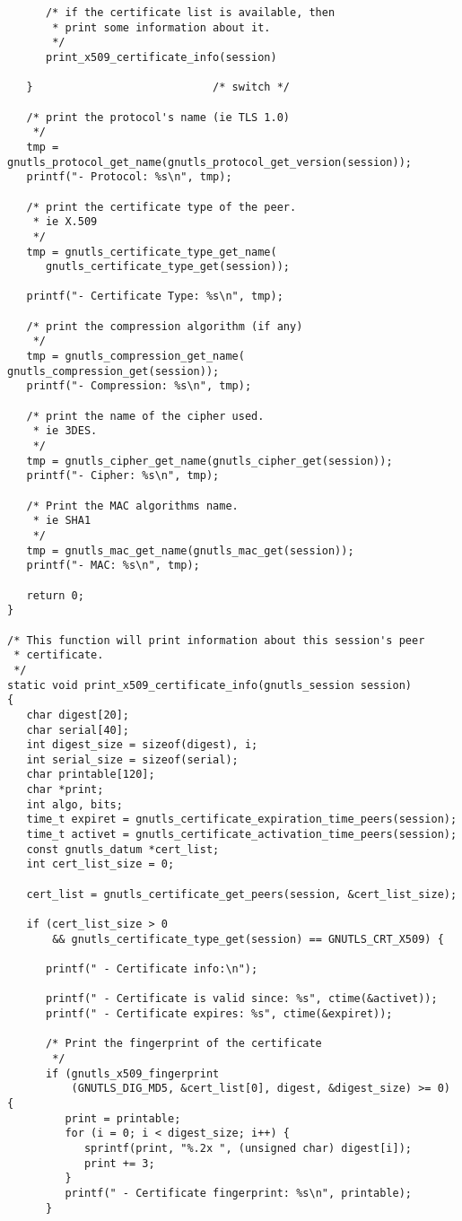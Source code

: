 \begin{verbatim}
      /* if the certificate list is available, then
       * print some information about it.
       */
      print_x509_certificate_info(session)

   }                            /* switch */

   /* print the protocol's name (ie TLS 1.0) 
    */
   tmp = gnutls_protocol_get_name(gnutls_protocol_get_version(session));
   printf("- Protocol: %s\n", tmp);

   /* print the certificate type of the peer.
    * ie X.509
    */
   tmp = gnutls_certificate_type_get_name(
      gnutls_certificate_type_get(session));

   printf("- Certificate Type: %s\n", tmp);

   /* print the compression algorithm (if any)
    */
   tmp = gnutls_compression_get_name( gnutls_compression_get(session));
   printf("- Compression: %s\n", tmp);

   /* print the name of the cipher used.
    * ie 3DES.
    */
   tmp = gnutls_cipher_get_name(gnutls_cipher_get(session));
   printf("- Cipher: %s\n", tmp);

   /* Print the MAC algorithms name.
    * ie SHA1
    */
   tmp = gnutls_mac_get_name(gnutls_mac_get(session));
   printf("- MAC: %s\n", tmp);

   return 0;
}

/* This function will print information about this session's peer
 * certificate. 
 */
static void print_x509_certificate_info(gnutls_session session)
{
   char digest[20];
   char serial[40];
   int digest_size = sizeof(digest), i;
   int serial_size = sizeof(serial);
   char printable[120];
   char *print;
   int algo, bits;
   time_t expiret = gnutls_certificate_expiration_time_peers(session);
   time_t activet = gnutls_certificate_activation_time_peers(session);
   const gnutls_datum *cert_list;
   int cert_list_size = 0;

   cert_list = gnutls_certificate_get_peers(session, &cert_list_size);

   if (cert_list_size > 0
       && gnutls_certificate_type_get(session) == GNUTLS_CRT_X509) {

      printf(" - Certificate info:\n");

      printf(" - Certificate is valid since: %s", ctime(&activet));
      printf(" - Certificate expires: %s", ctime(&expiret));

      /* Print the fingerprint of the certificate
       */
      if (gnutls_x509_fingerprint
          (GNUTLS_DIG_MD5, &cert_list[0], digest, &digest_size) >= 0) {
         print = printable;
         for (i = 0; i < digest_size; i++) {
            sprintf(print, "%.2x ", (unsigned char) digest[i]);
            print += 3;
         }
         printf(" - Certificate fingerprint: %s\n", printable);
      }


\end{verbatim}
